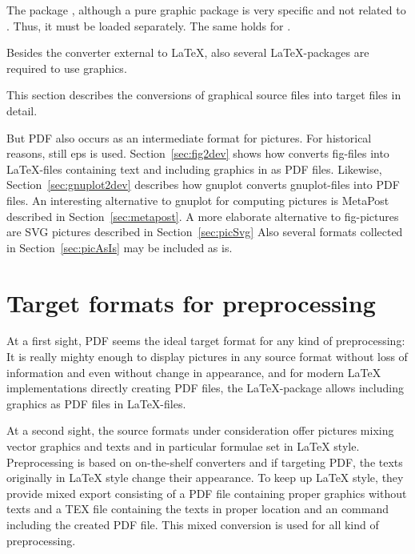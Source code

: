 The package , although a pure graphic package 
is very specific and not related to . 
Thus, it must be loaded separately. 
The same holds for . 









Besides the converter external to \LaTeX, 
also several \LaTeX-packages are required 
to use graphics. 


This section describes the conversions of 
graphical source files into target files 
in detail. 

But PDF also occurs as an intermediate format for pictures. 
For historical reasons, still \gls{eps} is used. 
Section~\ref{sec:fig2dev} shows how  converts fig-files 
into \LaTeX-files containing text and including graphics in as PDF files. 
Likewise, Section~\ref{sec:gnuplot2dev} describes 
how gnuplot converts gnuplot-files into PDF files. 
An interesting alternative to gnuplot for computing pictures 
is MetaPost described in Section~\ref{sec:metapost}. 
A more elaborate alternative to fig-pictures are SVG pictures 
described in Section~\ref{sec:picSvg}
Also several formats collected in Section~\ref{sec:picAsIs} 
may be included as is. 



\section{Target formats for preprocessing}\label{sec:preprocTarget}

At a first sight, PDF seems the ideal target format for any kind of preprocessing: 
It is really mighty enough to display pictures in any source format 
without loss of information and even without change in appearance, 
and for modern \LaTeX{} implementations directly creating PDF files, 
the \LaTeX-package  allows including graphics as PDF files in \LaTeX-files. 

At a second sight, the source formats under consideration 
offer pictures mixing vector graphics and texts and in particular formulae 
set in \LaTeX{} style. 
Preprocessing is based on on-the-shelf converters 
and if targeting PDF, the texts originally in \LaTeX{} style change their appearance. 
To keep up \LaTeX{} style, they provide mixed export 
consisting of a PDF file containing proper graphics 
without texts and a TEX file containing the texts in proper location 
and an  command including the created PDF file. 
This mixed conversion is used for all kind of preprocessing. 

